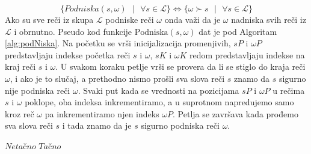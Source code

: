 \documentclass[12pt,oneside]{memoir}
\begin{document}
\begin{equation}
  \label{eqn:podniskaNadniska}
  \{Podniska(s,\omega) \textrm{ }| \textrm{ } \forall s \in \mathcal{L} \} 
  \Longleftrightarrow 
  \{\omega\succ s \textrm{ }| \textrm{ } \forall s \in\mathcal{L}\} 
\end{equation}
Ako su sve reči iz skupa $\mathcal{L}$ podniske reči $\omega$ onda važi da je $\omega$ nadniska svih reči
iz $\mathcal{L}$ i obrnutno. Pseudo kod funkcije $\textrm{Podniska}(s,\omega)$ dat je pod Algoritam \ref{alg:podNiska}.
Na početku se vrši inicijalizacija promenjivih, $sP$ i $\omega P$ predstavljaju indekse početka reči $s$ i $\omega$,
$sK$ i $\omega K$ redom predstavljaju indekse na kraj reči $s$ i $\omega$.
U svakom koraku petlje vrši se provera da li se stiglo do kraja reči $\omega$, i ako je to slučaj, a prethodno nismo prošli sva
slova reči $s$ znamo da $s$ sigurno nije podniska reči $\omega$. Svaki put kada se vrednosti na pozicijama $sP$ i 
$\omega P$ u rečima $s$ i $\omega$ poklope, oba indeksa inkrementiramo, a u suprotnom napredujemo samo kroz reč
$\omega$ pa inkrementiramo njen indeks $\omega P$. Petlja se završava kada prođemo sva slova reči $s$ i tada znamo
da je $s$ sigurno podniska reči $\omega$.
\\
\begin{algorithm}
  \caption{$\textbf{ZajedničkaNadniska}\bm{(\omega)}$}
  \label{alg:zajNad}
  \begin{algorithmic}[1]
    \State \Return $Neta\textrm{č}no$
    \EndIf
  \EndFor
  \State
  \State \Return $Ta\textrm{č}no$
  \end{algorithmic}
  \end{algorithm}
\end{document}
